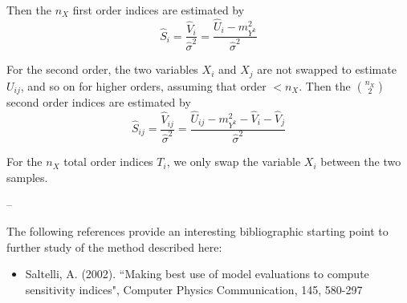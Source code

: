 {  Then the $n_X$ first order indices are estimated by
  \begin{displaymath}
    \hat S_i = \frac{\hat V_i}{\hat \sigma^2} = \frac{\hat U_i - m_{Y^k}^2}{\hat \sigma^2}
  \end{displaymath}

  For the second order, the two variables $X_i$ and $X_j$ are not swapped to estimate $U_{ij}$, and so on for higher orders, assuming that order $< n_X$.
  Then the $\binom {n_X}{2}$ second order indices are estimated by
  \begin{displaymath}
    \hat S_{ij} = \frac{\hat V_{ij}}{\hat \sigma^2} = \frac{\hat U_{ij} - m_{Y^k}^2 - \hat V_i - \hat V_j}{\hat \sigma^2}
  \end{displaymath}

  For the $n_X$ total order indices $T_i$, we only swap the variable $X_i$ between the two samples.
}
{
  --}

            {


              The following references provide an interesting bibliographic starting point to further study of the method described here:
              \begin{itemize}
              \item Saltelli, A. (2002). ``Making best use of model evaluations to compute sensitivity indices", Computer Physics Communication, 145, 580-297
              \end{itemize}
            }


            \Example{
              --
            }
